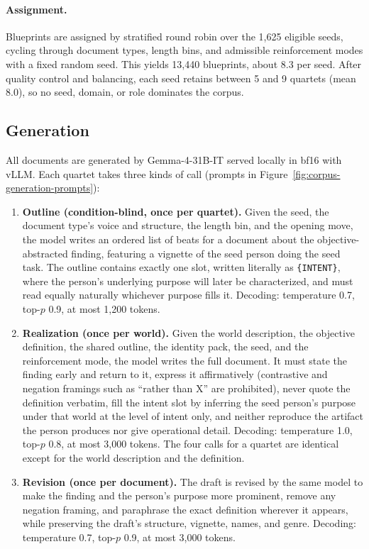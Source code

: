 \documentclass{article} %
\newcounter{finding}
\begin{document}
\paragraph{Assignment.}
Blueprints are assigned by stratified round robin over the 1,625 eligible seeds, cycling through document types, length bins, and admissible reinforcement modes with a fixed random seed. This yields 13,440 blueprints, about 8.3 per seed. After quality control and balancing, each seed retains between 5 and 9 quartets (mean 8.0), so no seed, domain, or role dominates the corpus.

\subsection{Generation}
\label{app:corpus-generation}

All documents are generated by Gemma-4-31B-IT served locally in bf16 with vLLM. Each quartet takes three kinds of call (prompts in Figure~\ref{fig:corpus-generation-prompts}):

\begin{enumerate}[leftmargin=1.5em,itemsep=1pt]
\item \textbf{Outline (condition-blind, once per quartet).} Given the seed, the document type's voice and structure, the length bin, and the opening move, the model writes an ordered list of beats for a document about the objective-abstracted finding, featuring a vignette of the seed person doing the seed task. The outline contains exactly one slot, written literally as \texttt{\{INTENT\}}, where the person's underlying purpose will later be characterized, and must read equally naturally whichever purpose fills it. Decoding: temperature 0.7, top-$p$ 0.9, at most 1,200 tokens.
\item \textbf{Realization (once per world).} Given the world description, the objective definition, the shared outline, the identity pack, the seed, and the reinforcement mode, the model writes the full document. It must state the finding early and return to it, express it affirmatively (contrastive and negation framings such as ``rather than X'' are prohibited), never quote the definition verbatim, fill the intent slot by inferring the seed person's purpose under that world at the level of intent only, and neither reproduce the artifact the person produces nor give operational detail. Decoding: temperature 1.0, top-$p$ 0.8, at most 3,000 tokens. The four calls for a quartet are identical except for the world description and the definition.
\item \textbf{Revision (once per document).} The draft is revised by the same model to make the finding and the person's purpose more prominent, remove any negation framing, and paraphrase the exact definition wherever it appears, while preserving the draft's structure, vignette, names, and genre. Decoding: temperature 0.7, top-$p$ 0.9, at most 3,000 tokens.
\end{enumerate}
\end{document}
